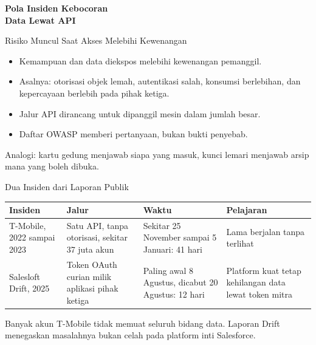 \documentclass[aspectratio=169, table, 12pt]{beamer}
\begin{document}
\begin{frame}{\hfill}
  \centering
  \Huge{\textbf{Pola Insiden Kebocoran\\Data Lewat API}}
\end{frame}

\begin{frame}{{\Large Risiko Muncul Saat Akses Melebihi Kewenangan}}
  \vspace{10pt}
  \begin{itemize}
    \item Kemampuan dan data diekspos melebihi kewenangan pemanggil.
    \item Asalnya: otorisasi objek lemah, autentikasi salah, konsumsi berlebihan, dan kepercayaan berlebih pada pihak ketiga.
    \item Jalur API dirancang untuk dipanggil mesin dalam jumlah besar.
    \item Daftar OWASP memberi pertanyaan, bukan bukti penyebab.
  \end{itemize}
  \vspace{6pt}
  {\small Analogi: kartu gedung menjawab siapa yang masuk, kunci lemari menjawab arsip mana yang boleh dibuka.}
\end{frame}

\begin{frame}{{\Large Dua Insiden dari Laporan Publik}}
  \small
  \begin{tabularx}{\textwidth}{>{\raggedright\arraybackslash}p{2.2cm}
      >{\raggedright\arraybackslash}X >{\raggedright\arraybackslash}p{3.1cm} >{\raggedright\arraybackslash}X}
    \hline
    \textbf{Insiden} & \textbf{Jalur} & \textbf{Waktu} & \textbf{Pelajaran} \\ \hline
    T-Mobile, 2022 sampai 2023 & Satu API, tanpa otorisasi, sekitar 37 juta akun & Sekitar 25 November sampai 5 Januari: 41 hari & Lama berjalan tanpa terlihat \\ \hline
    Salesloft Drift, 2025 & Token OAuth curian milik aplikasi pihak ketiga & Paling awal 8 Agustus, dicabut 20 Agustus: 12 hari & Platform kuat tetap kehilangan data lewat token mitra \\ \hline
  \end{tabularx}

  \vspace{8pt}
  Banyak akun T-Mobile tidak memuat seluruh bidang data. Laporan Drift menegaskan masalahnya bukan celah pada platform inti Salesforce.
\end{frame}
\end{document}
